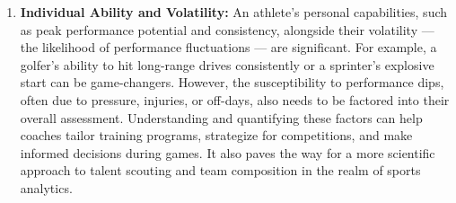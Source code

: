 \documentclass{article}
\begin{document}
\begin{enumerate}
      \item \textbf{Individual Ability and Volatility:} An athlete's personal capabilities, such as peak performance potential and consistency, alongside their volatility — the likelihood of performance fluctuations — are significant. For example, a golfer's ability to hit long-range drives consistently or a sprinter's explosive start can be game-changers. However, the susceptibility to performance dips, often due to pressure, injuries, or off-days, also needs to be factored into their overall assessment.
      Understanding and quantifying these factors can help coaches tailor training programs, strategize for competitions, and make informed decisions during games. It also paves the way for a more scientific approach to talent scouting and team composition in the realm of sports analytics.
\end{enumerate}
\end{document}
